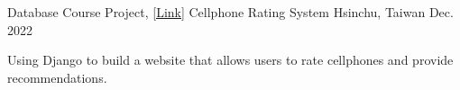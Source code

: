 \begin{cventries}


  \cventry
    {Database Course Project, \href{https://github.com/KJLdefeated/Database-Final-project}{\underline{[Link]}}} 
    {Cellphone Rating System} 
    {Hsinchu, Taiwan} 
    {Dec. 2022} 
    {
      \begin{cvitems} %
        \item {Using Django to build a website that allows users to rate cellphones and provide recommendations.}
      \end{cvitems}
    }



\end{cventries}
